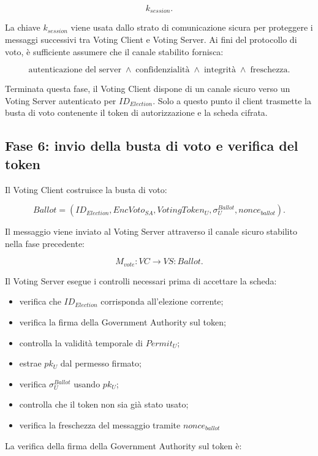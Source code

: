 \documentclass[a4paper,12pt]{article}
\begin{document}
\[
	k_{session}.
\]

La chiave \(k_{session}\) viene usata dallo strato di comunicazione sicura per proteggere i messaggi successivi tra Voting Client e Voting Server.
Ai fini del protocollo di voto, \`e sufficiente assumere che il canale stabilito fornisca:

\[
	\text{autenticazione del server} \;\land\;
	\text{confidenzialit\`a} \;\land\;
	\text{integrit\`a} \;\land\;
	\text{freschezza}.
\]

Terminata questa fase, il Voting Client dispone di un canale sicuro verso un Voting Server autenticato per \(ID_{Election}\).
Solo a questo punto il client trasmette la busta di voto contenente il token di autorizzazione e la scheda cifrata.

\subsection{Fase 6: invio della busta di voto e verifica del token}

Il Voting Client costruisce la busta di voto:

\[
	Ballot =
	(ID_{Election}, EncVoto_{SA}, VotingToken_U, \sigma_U^{Ballot}, nonce_{ballot}).
\]

Il messaggio viene inviato al Voting Server attraverso il canale sicuro stabilito nella fase precedente:

\[
	M_{vote} : VC \rightarrow VS : Ballot.
\]

Il Voting Server esegue i controlli necessari prima di accettare la scheda:

\begin{itemize}
	\item verifica che \(ID_{Election}\) corrisponda all'elezione corrente;
	\item verifica la firma della Government Authority sul token;
	\item controlla la validit\`a temporale di \(Permit_U\);
	\item estrae \(pk_U\) dal permesso firmato;
	\item verifica \(\sigma_U^{Ballot}\) usando \(pk_U\);
	\item controlla che il token non sia gi\`a stato usato;
	\item verifica la freschezza del messaggio tramite \(nonce_{ballot}\)
\end{itemize}

La verifica della firma della Government Authority sul token \`e:
\end{document}

